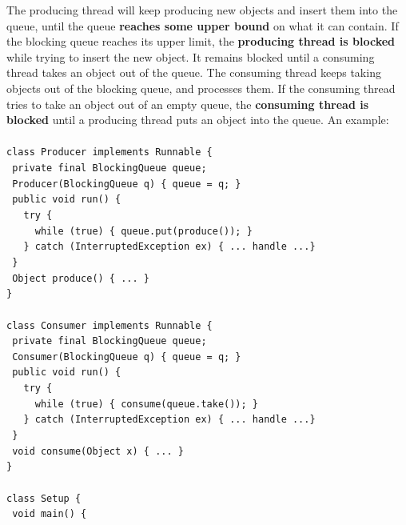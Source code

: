 \documentclass{article}
\begin{document}
The producing thread will keep producing new objects and insert them into the queue, until the queue \textbf{reaches some upper bound} on what it can contain. If the blocking queue reaches its upper limit, the \textbf{producing thread is blocked} while trying to insert the new object. It remains blocked until a consuming thread takes an object out of the queue. The consuming thread keeps taking objects out of the blocking queue, and processes them. If the consuming thread tries to take an object out of an empty queue, the \textbf{consuming thread is blocked} until a producing thread puts an object into the queue. An example:\\\\
    \lstinline|class Producer implements Runnable {|\\
    \lstinline| private final BlockingQueue queue;|\\
    \lstinline| Producer(BlockingQueue q) { queue = q; }|\\
    \lstinline| public void run() {|\\
    \lstinline|   try {|\\
    \lstinline|     while (true) { queue.put(produce()); }|\\
    \lstinline|   } catch (InterruptedException ex) { ... handle ...}|\\
    \lstinline| }|\\
    \lstinline| Object produce() { ... }|\\
    \lstinline|}|\\\\
    \lstinline|class Consumer implements Runnable {|\\
    \lstinline| private final BlockingQueue queue;|\\
    \lstinline| Consumer(BlockingQueue q) { queue = q; }|\\
    \lstinline| public void run() {|\\
    \lstinline|   try {|\\
    \lstinline|     while (true) { consume(queue.take()); }|\\
    \lstinline|   } catch (InterruptedException ex) { ... handle ...}|\\
    \lstinline| }|\\
    \lstinline| void consume(Object x) { ... }|\\
    \lstinline|}|\\\\
    \lstinline|class Setup {|\\
    \lstinline| void main() {|\\
\end{document}
